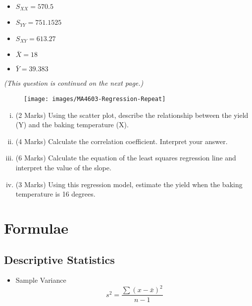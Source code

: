 \documentclass[a4paper,12pt]{article}
\begin{document}
\begin{multicols}{3}
	\begin{itemize}
		\item $S_{XX} = 570.5$
		\item $S_{YY} =  751.1525$
		\item $S_{XY} = 613.27$
		\item $\bar{X} = 18$
		\item $\bar{Y} = 39.383$
	\end{itemize}
\end{multicols}
\medskip
\textit{(This question is continued on the next page.)}
\newpage

\begin{figure}
\centering
\texttt{[image: images/MA4603-Regression-Repeat]}
\caption{}
\label{fig:ma4603-regression-repeat}
\end{figure}
\medskip
\begin{enumerate}[(i)]
	
	\item (2 Marks) Using the scatter plot, describe the relationship between the yield (Y) and the baking temperature (X).
	
	
	
	
	
	\item (4 Marks) Calculate the correlation coefficient. Interpret your answer.
	\item (6 Marks) Calculate the equation of the least squares regression line and interpret the value of the slope.
	\item (3 Marks) Using this regression model, estimate the yield when the baking temperature is 16 degrees.
\end{enumerate}

\newpage


\section*{Formulae}
\subsection*{Descriptive Statistics}
\begin{itemize}
	\item Sample Variance
	\begin{equation*}
	s^2 = \frac{\sum (x-\bar{x})^2}{n-1}
	\end{equation*}
\end{itemize}
\end{document}
